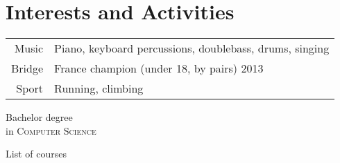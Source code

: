 \documentclass[a4paper,10pt]{article} %
\begin{document}
\section{Interests and Activities}

\begin{tabular}{rl}
  Music & Piano, keyboard percussions, doublebass, drums, singing \\
  Bridge & France champion (under 18, by pairs) 2013 \\
  Sport & Running, climbing \\
\end{tabular}


\newpage


\par{\centering\Large \hypertarget{notes}{Bachelor degree \\in \textsc{Computer
      Science}}\par}\large{\centering List of courses\par}\normalsize
\end{document}
